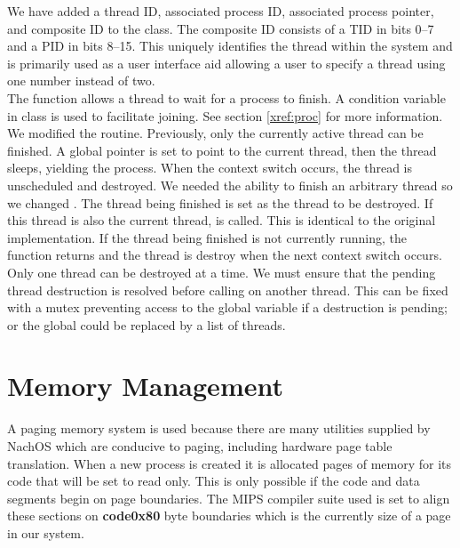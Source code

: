     We have added a thread ID, associated process ID, associated process pointer, and
    composite ID to the  class. The composite ID consists of a TID in bits
    0--7 and a PID in bits 8--15. This uniquely identifies the thread within the system
    and is primarily used as a user interface aid allowing a user to specify a thread
    using one number instead of two.\\

    The  function allows a thread to wait for a process to finish. A
    condition variable in class  is used to facilitate joining. See section
    \ref{xref:proc} for more information. We modified the 
    routine. Previously, only the currently active thread can be finished. A global
    pointer is set to point to the current thread, then the thread sleeps, yielding the
    process. When the context switch occurs, the thread is unscheduled and destroyed. We
    needed the ability to finish an arbitrary thread so we changed . The
    thread being finished is set as the thread to be destroyed. If this thread is also
    the current thread,  is called. This is identical to the original
    implementation. If the thread being finished is not currently running, the
     function returns and the thread is destroy when the next context
    switch occurs. Only one thread can be destroyed at a time. We must ensure that the
    pending thread destruction is resolved before calling  on another
    thread. This can be fixed with a mutex preventing access to the
     global variable if a destruction is pending; or the global
     could be replaced by a list of threads.\\
  
  \section{Memory Management}
    A paging memory system is used because there are many utilities supplied by NachOS
    which are conducive to paging, including hardware page table translation. When a new
    process is created it is allocated pages of memory for its code that will be set to
    read only. This is only possible if the code and data segments begin on page
    boundaries. The MIPS compiler suite used is set to align these sections on
    \textbf{code{0x80}} byte boundaries which is the currently size of a page in our
    system.\\

